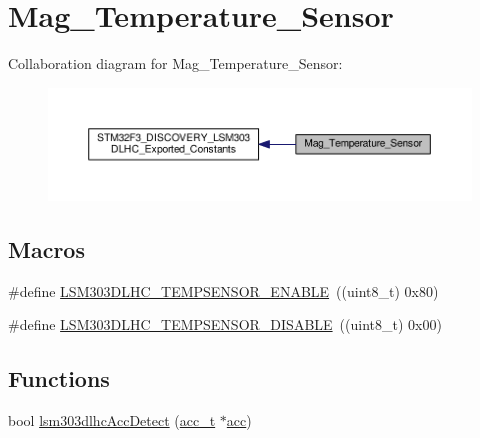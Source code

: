 \hypertarget{group__Mag__Temperature__Sensor}{\section{Mag\+\_\+\+Temperature\+\_\+\+Sensor}
\label{group__Mag__Temperature__Sensor}
}
Collaboration diagram for Mag\+\_\+\+Temperature\+\_\+\+Sensor\+:\nopagebreak
\begin{figure}[H]
\begin{center}
\leavevmode
\includegraphics[width=350pt]{group__Mag__Temperature__Sensor}
\end{center}
\end{figure}
\subsection*{Macros}
\begin{DoxyCompactItemize}
\item 
\#define \hyperlink{group__Mag__Temperature__Sensor_ga4764f8f4ed709f63c6832bc1646a4e91}{L\+S\+M303\+D\+L\+H\+C\+\_\+\+T\+E\+M\+P\+S\+E\+N\+S\+O\+R\+\_\+\+E\+N\+A\+B\+L\+E}~((uint8\+\_\+t) 0x80)
\item 
\#define \hyperlink{group__Mag__Temperature__Sensor_gab273db73f96360b9b7539ecd0942a96d}{L\+S\+M303\+D\+L\+H\+C\+\_\+\+T\+E\+M\+P\+S\+E\+N\+S\+O\+R\+\_\+\+D\+I\+S\+A\+B\+L\+E}~((uint8\+\_\+t) 0x00)
\end{DoxyCompactItemize}
\subsection*{Functions}
\begin{DoxyCompactItemize}
\item 
bool \hyperlink{group__Mag__Temperature__Sensor_gaef89539a7bbde154c72ae78777012de1}{lsm303dlhc\+Acc\+Detect} (\hyperlink{accgyro_8h_a2fc25e126fa4597e5d73308e19d092b9}{acc\+\_\+t} $\ast$\hyperlink{msp__unittest_8cc_a5008519710746affca50c04439353fe3}{acc})
\end{DoxyCompactItemize}
